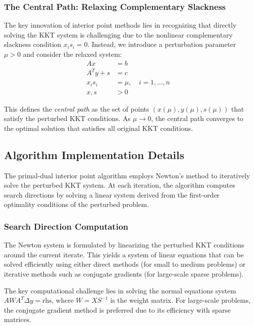 \subsubsection{The Central Path: Relaxing Complementary Slackness}

The key innovation of interior point methods lies in recognizing that directly solving the KKT system is challenging due to the nonlinear complementary slackness condition $x_i s_i = 0$. Instead, we introduce a perturbation parameter $\mu > 0$ and consider the relaxed system:
\begin{align}
Ax &= b \\
A^T y + s &= c \\
x_i s_i &= \mu, \quad i = 1, \ldots, n \\
x, s &> 0
\end{align}

This defines the \emph{central path} as the set of points $(x(\mu), y(\mu), s(\mu))$ that satisfy the perturbed KKT conditions. As $\mu \to 0$, the central path converges to the optimal solution that satisfies all original KKT conditions.


\subsection{Algorithm Implementation Details}

The primal-dual interior point algorithm employs Newton's method to iteratively solve the perturbed KKT system. At each iteration, the algorithm computes search directions by solving a linear system derived from the first-order optimality conditions of the perturbed problem.

\subsubsection{Search Direction Computation}

The Newton system is formulated by linearizing the perturbed KKT conditions around the current iterate. This yields a system of linear equations that can be solved efficiently using either direct methods (for small to medium problems) or iterative methods such as conjugate gradients (for large-scale sparse problems).

The key computational challenge lies in solving the normal equations system $AWA^T \Delta y = \text{rhs}$, where $W = XS^{-1}$ is the weight matrix. For large-scale problems, the conjugate gradient method is preferred due to its efficiency with sparse matrices.

